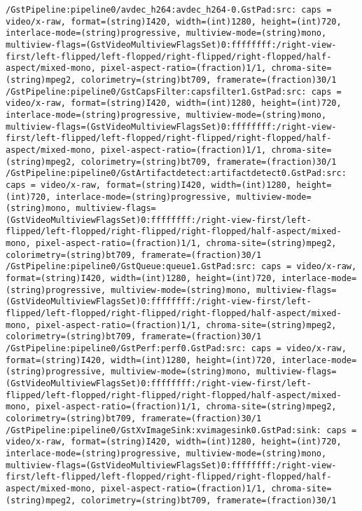 \documentclass[12pt,oneside]{book}
\begin{document}
\begin{lstlisting}
/GstPipeline:pipeline0/avdec_h264:avdec_h264-0.GstPad:src: caps = video/x-raw, format=(string)I420, width=(int)1280, height=(int)720, interlace-mode=(string)progressive, multiview-mode=(string)mono, multiview-flags=(GstVideoMultiviewFlagsSet)0:ffffffff:/right-view-first/left-flipped/left-flopped/right-flipped/right-flopped/half-aspect/mixed-mono, pixel-aspect-ratio=(fraction)1/1, chroma-site=(string)mpeg2, colorimetry=(string)bt709, framerate=(fraction)30/1
/GstPipeline:pipeline0/GstCapsFilter:capsfilter1.GstPad:src: caps = video/x-raw, format=(string)I420, width=(int)1280, height=(int)720, interlace-mode=(string)progressive, multiview-mode=(string)mono, multiview-flags=(GstVideoMultiviewFlagsSet)0:ffffffff:/right-view-first/left-flipped/left-flopped/right-flipped/right-flopped/half-aspect/mixed-mono, pixel-aspect-ratio=(fraction)1/1, chroma-site=(string)mpeg2, colorimetry=(string)bt709, framerate=(fraction)30/1
/GstPipeline:pipeline0/GstArtifactdetect:artifactdetect0.GstPad:src: caps = video/x-raw, format=(string)I420, width=(int)1280, height=(int)720, interlace-mode=(string)progressive, multiview-mode=(string)mono, multiview-flags=(GstVideoMultiviewFlagsSet)0:ffffffff:/right-view-first/left-flipped/left-flopped/right-flipped/right-flopped/half-aspect/mixed-mono, pixel-aspect-ratio=(fraction)1/1, chroma-site=(string)mpeg2, colorimetry=(string)bt709, framerate=(fraction)30/1
/GstPipeline:pipeline0/GstQueue:queue1.GstPad:src: caps = video/x-raw, format=(string)I420, width=(int)1280, height=(int)720, interlace-mode=(string)progressive, multiview-mode=(string)mono, multiview-flags=(GstVideoMultiviewFlagsSet)0:ffffffff:/right-view-first/left-flipped/left-flopped/right-flipped/right-flopped/half-aspect/mixed-mono, pixel-aspect-ratio=(fraction)1/1, chroma-site=(string)mpeg2, colorimetry=(string)bt709, framerate=(fraction)30/1
/GstPipeline:pipeline0/GstPerf:perf0.GstPad:src: caps = video/x-raw, format=(string)I420, width=(int)1280, height=(int)720, interlace-mode=(string)progressive, multiview-mode=(string)mono, multiview-flags=(GstVideoMultiviewFlagsSet)0:ffffffff:/right-view-first/left-flipped/left-flopped/right-flipped/right-flopped/half-aspect/mixed-mono, pixel-aspect-ratio=(fraction)1/1, chroma-site=(string)mpeg2, colorimetry=(string)bt709, framerate=(fraction)30/1
/GstPipeline:pipeline0/GstXvImageSink:xvimagesink0.GstPad:sink: caps = video/x-raw, format=(string)I420, width=(int)1280, height=(int)720, interlace-mode=(string)progressive, multiview-mode=(string)mono, multiview-flags=(GstVideoMultiviewFlagsSet)0:ffffffff:/right-view-first/left-flipped/left-flopped/right-flipped/right-flopped/half-aspect/mixed-mono, pixel-aspect-ratio=(fraction)1/1, chroma-site=(string)mpeg2, colorimetry=(string)bt709, framerate=(fraction)30/1

\end{lstlisting}
\end{document}
